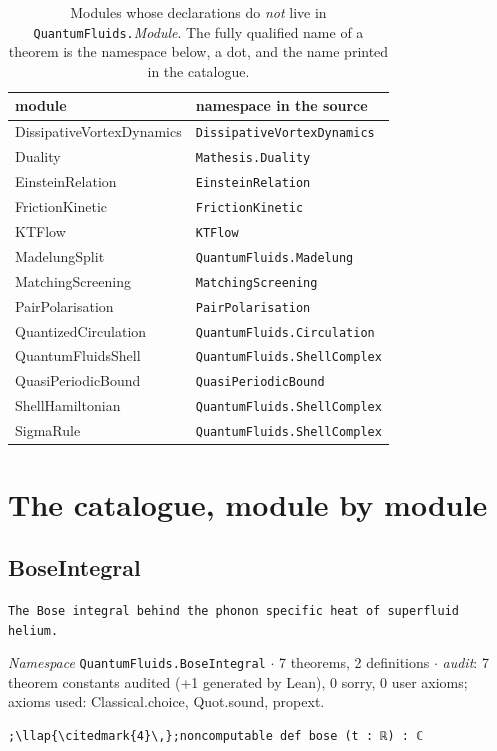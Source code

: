 \begin{table}[t]\centering\footnotesize\setlength{\tabcolsep}{3.2pt}
\caption{Modules whose declarations do \emph{not} live in \texttt{QuantumFluids.}\emph{Module}. The fully qualified name of a theorem is the namespace below, a dot, and the name printed in the catalogue.}\label{appA:tab-ns}
\begin{tabular}{@{}ll@{}}\toprule module & namespace in the source \\\midrule
DissipativeVortexDynamics & \texttt{DissipativeVortexDynamics} \\
Duality & \texttt{Mathesis.\allowbreak{}Duality} \\
EinsteinRelation & \texttt{EinsteinRelation} \\
FrictionKinetic & \texttt{FrictionKinetic} \\
KTFlow & \texttt{KTFlow} \\
MadelungSplit & \texttt{QuantumFluids.\allowbreak{}Madelung} \\
MatchingScreening & \texttt{MatchingScreening} \\
PairPolarisation & \texttt{PairPolarisation} \\
QuantizedCirculation & \texttt{QuantumFluids.\allowbreak{}Circulation} \\
QuantumFluidsShell & \texttt{QuantumFluids.\allowbreak{}ShellComplex} \\
QuasiPeriodicBound & \texttt{QuasiPeriodicBound} \\
ShellHamiltonian & \texttt{QuantumFluids.\allowbreak{}ShellComplex} \\
SigmaRule & \texttt{QuantumFluids.\allowbreak{}ShellComplex} \\
\bottomrule\end{tabular}\end{table}
\section{The catalogue, module by module}
\subsection{BoseIntegral}\label{appA:BoseIntegral}
{\footnotesize\raggedright\texttt{The Bose integral behind the phonon specific heat of superfluid helium.\allowbreak{}}\par}
{\footnotesize\raggedright\emph{Namespace} \texttt{QuantumFluids.\allowbreak{}BoseIntegral} $\cdot$ 7 theorems, 2 definitions $\cdot$ \emph{audit}: 7 theorem constants audited (+1 generated by Lean), 0 sorry, 0 user axioms; axioms used: Classical.choice, Quot.sound, propext.\par}
\vspace{1pt}
\begin{lstlisting}[style=leancat]
;\llap{\citedmark{4}\,};noncomputable def bose (t : ℝ) : ℂ
\end{lstlisting}

